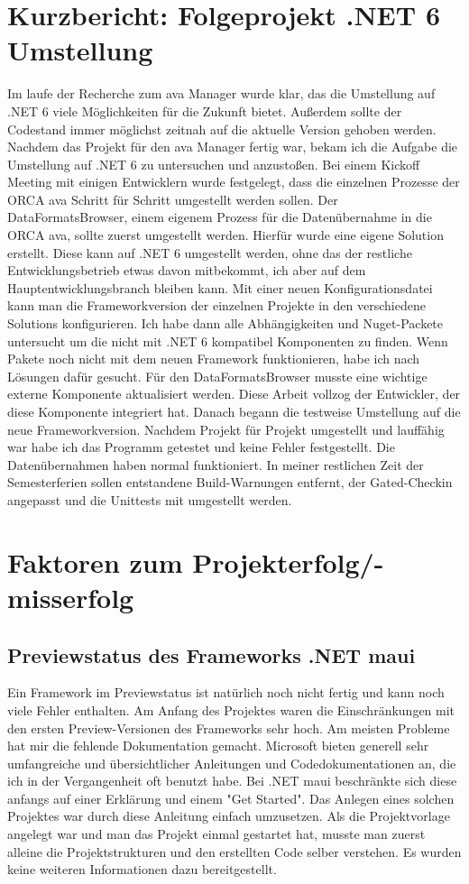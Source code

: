 \chapter {Kurzbericht: Folgeprojekt .NET 6 Umstellung}
Im laufe der Recherche zum \ac{ava} Manager wurde klar, das die Umstellung auf .NET 6 viele Möglichkeiten für die Zukunft bietet. Außerdem sollte der Codestand immer möglichst zeitnah auf die aktuelle Version gehoben werden. Nachdem das Projekt für den \ac{ava} Manager fertig war, bekam ich die Aufgabe die Umstellung auf .NET 6 zu untersuchen und anzustoßen. Bei einem Kickoff Meeting mit einigen Entwicklern wurde festgelegt, dass die einzelnen Prozesse der ORCA \ac{ava} Schritt für Schritt umgestellt werden sollen. Der DataFormatsBrowser, einem eigenem Prozess für die Datenübernahme in die ORCA \ac{ava}, sollte zuerst umgestellt werden. Hierfür wurde eine eigene Solution erstellt. Diese kann auf .NET 6 umgestellt werden, ohne das der restliche Entwicklungsbetrieb etwas davon mitbekommt, ich aber auf dem Hauptentwicklungsbranch bleiben kann. Mit einer neuen Konfigurationsdatei kann man die Frameworkversion der einzelnen Projekte in den verschiedene Solutions konfigurieren. Ich habe dann alle Abhängigkeiten und Nuget-Packete untersucht um die nicht mit .NET 6 kompatibel Komponenten zu finden. Wenn Pakete noch nicht mit dem neuen Framework funktionieren, habe ich nach Lösungen dafür gesucht. Für den DataFormatsBrowser musste eine wichtige externe Komponente aktualisiert werden. Diese Arbeit vollzog der Entwickler, der diese Komponente integriert hat.
Danach begann die testweise Umstellung auf die neue Frameworkversion. Nachdem Projekt für Projekt umgestellt und lauffähig war habe ich das Programm getestet und keine Fehler festgestellt. Die Datenübernahmen haben normal funktioniert. In meiner restlichen Zeit der Semesterferien sollen entstandene Build-Warnungen entfernt, der Gated-Checkin angepasst und die Unittests mit umgestellt werden.

\chapter{Faktoren zum Projekterfolg/-misserfolg}

\section{Previewstatus des Frameworks .NET \ac{maui}}
Ein Framework im Previewstatus ist natürlich noch nicht fertig und kann noch viele Fehler enthalten. Am Anfang des Projektes waren die Einschränkungen mit den ersten Preview-Versionen des Frameworks sehr hoch. Am meisten Probleme hat mir die fehlende Dokumentation gemacht. Microsoft bieten generell sehr umfangreiche und übersichtlicher Anleitungen und Codedokumentationen an, die ich in der Vergangenheit oft benutzt habe. Bei .NET \ac{maui} beschränkte sich diese anfangs auf einer Erklärung und einem "Get Started". Das Anlegen eines solchen Projektes war durch diese Anleitung einfach umzusetzen. Als die Projektvorlage angelegt war und man das Projekt einmal gestartet hat, musste man zuerst alleine die Projektstrukturen und den erstellten Code selber verstehen. Es wurden keine weiteren Informationen dazu bereitgestellt.

